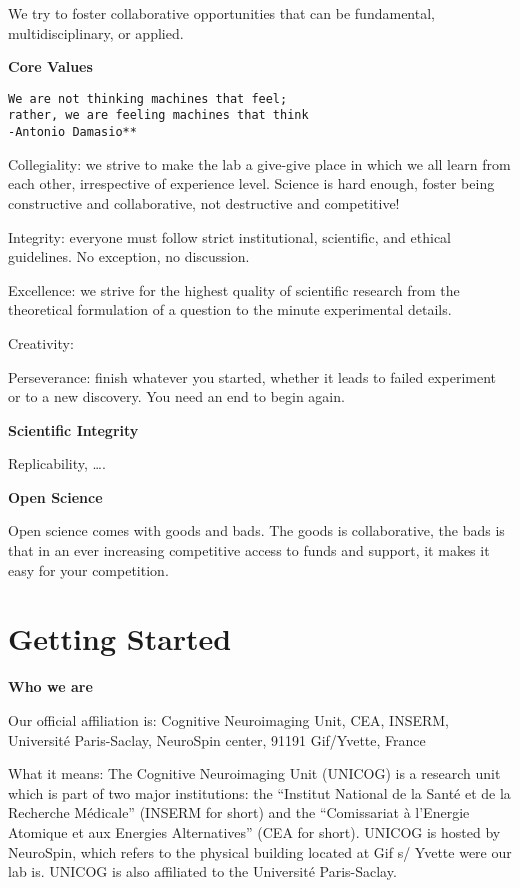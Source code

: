 \documentclass[]{book}
\begin{document}
We try to foster collaborative opportunities that can be fundamental, multidisciplinary, or applied.

\textbf{Core Values}

\begin{verbatim}
We are not thinking machines that feel; 
rather, we are feeling machines that think
-Antonio Damasio**
\end{verbatim}

Collegiality: we strive to make the lab a give-give place in which we all learn from each other, irrespective of experience level. Science is hard enough, foster being constructive and collaborative, not destructive and competitive!

Integrity: everyone must follow strict institutional, scientific, and ethical guidelines. No exception, no discussion.

Excellence: we strive for the highest quality of scientific research from the theoretical formulation of a question to the minute experimental details.

Creativity:

Perseverance: finish whatever you started, whether it leads to failed experiment or to a new discovery. You need an end to begin again.

\textbf{Scientific Integrity}

Replicability, \ldots{}.

\textbf{Open Science}

Open science comes with goods and bads. The goods is collaborative, the bads is that in an ever increasing competitive access to funds and support, it makes it easy for your competition.

\hypertarget{getting-started}{%
\chapter{Getting Started}\label{getting-started}}

\textbf{Who we are}

Our official affiliation is:
Cognitive Neuroimaging Unit, CEA, INSERM, Université Paris-Saclay, NeuroSpin center, 91191 Gif/Yvette, France

What it means:
The Cognitive Neuroimaging Unit (UNICOG) is a research unit which is part of two major institutions: the ``Institut National de la Santé et de la Recherche Médicale'' (INSERM for short) and the ``Comissariat à l'Energie Atomique et aux Energies Alternatives'' (CEA for short).
UNICOG is hosted by NeuroSpin, which refers to the physical building located at Gif s/ Yvette were our lab is. UNICOG is also affiliated to the Université Paris-Saclay.
\end{document}
